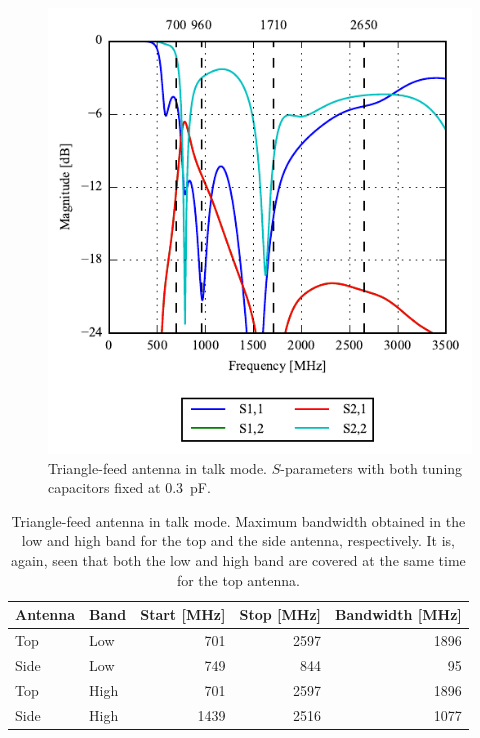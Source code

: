 \begin{figure}[htbp]
    \centering
    \includegraphics{img/tech_sol/trianglefeed/talk_mode/sparams.pdf}
    \caption{Triangle-feed antenna in talk mode. $S$-parameters with both tuning capacitors fixed at \SI{0.3}{pF}.}
    \label{fig:triang_sparam_talk}
\end{figure}

\begin{table}[htbp]
    \centering
    \begin{tabular}{|l|l|r|r|r|}
        \hline
        Antenna & Band & Start [MHz] & Stop [MHz] & Bandwidth [MHz] \\
        \hline
        Top     & Low  & 701         & 2597       & 1896 \\
        Side    & Low  & 749         & 844        & 95   \\
        \hline
        Top     & High & 701         & 2597       & 1896 \\
        Side    & High & 1439        & 2516       & 1077 \\
        \hline
    \end{tabular}
    \caption{Triangle-feed antenna in talk mode. Maximum bandwidth obtained in the low and high band for the top and the side antenna, respectively. It is, again, seen that both the low and high band are covered at the same time for the top antenna.}
    \label{tab:bw_sol2talk}
\end{table}

